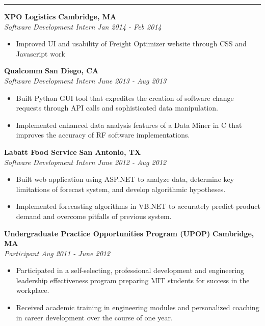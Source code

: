 \documentclass{res}
\begin{document}
\begin{resume}
\noindent\rule{\resumewidth}{0.4pt}   %

\vspace{-5pt}

 {\bf XPO Logistics} \hfill {\bf Cambridge, MA} \\
{\textit {Software Development Intern}} \hfill {\textit {Jan 2014 - Feb 2014}} 
 \begin{itemize}
\renewcommand{\labelitemi}{\ding{117}}
\itemsep -2pt  %

 \item Improved UI and usability of Freight Optimizer website through CSS and Javascript work
 \end{itemize}

 {\bf Qualcomm} \hfill {\bf San Diego, CA} \\
{\textit {Software Development Intern}} \hfill {\textit {June 2013 - Aug 2013}} 
 \begin{itemize} 
\renewcommand{\labelitemi}{\ding{117}}
\itemsep -2pt  %
 \item Built Python GUI tool that expedites the creation of software 
	change requests through API calls and sophisticated data manipulation.
 \item Implemented enhanced data analysis features of a Data Miner in C that
	 improves the accuracy of RF software implementations.
 \end{itemize}

 {\bf Labatt Food Service} \hfill {\bf San Antonio, TX} \\
{\textit {Software Development Intern}} \hfill {\textit {June 2012 - Aug 2012}} 
\begin{itemize}
\renewcommand{\labelitemi}{\ding{117}}
\itemsep -2pt  %
 \item Built web application using ASP.NET to analyze data, determine key limitations of
	forecast system, and develop algorithmic hypotheses.
 \item Implemented forecasting algorithms in VB.NET to accurately predict product demand
	and overcome pitfalls of previous system.
 \end{itemize}

 {\bf Undergraduate Practice Opportunities Program (UPOP)} \hfill {\bf Cambridge, MA} \\
{\textit {Participant}} \hfill {\textit {Aug 2011 - June 2012}}
 \begin{itemize} 
\renewcommand{\labelitemi}{\ding{117}}
\itemsep -2pt  %
 \item	Participated in a self-selecting, professional development and engineering leadership effectiveness program preparing MIT students for success in the workplace.
 \item Received academic training in engineering modules and personalized coaching in career development over the course of one year. 
 \end{itemize}


\end{resume}
\end{document}
